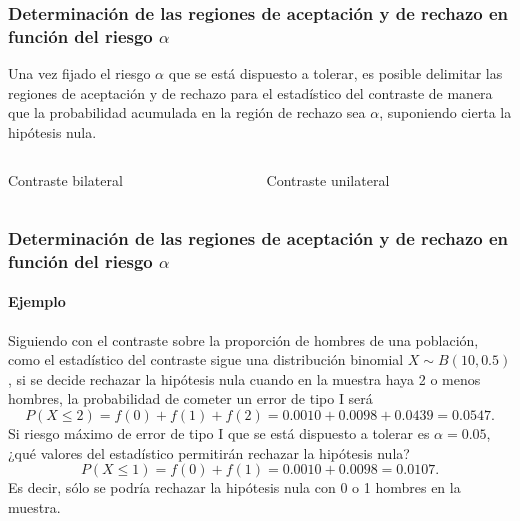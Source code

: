 \begin{frame}
\frametitle{Determinación de las regiones de aceptación y de rechazo en función del riesgo $\alpha$}
Una vez fijado el riesgo $\alpha$ que se está dispuesto a tolerar, es posible delimitar las regiones de aceptación y de rechazo para el estadístico del contraste de manera que la probabilidad acumulada en la región de rechazo sea $\alpha$, suponiendo cierta la hipótesis nula.
\begin{columns}
\begin{column}{0.5\textwidth}
\begin{center}
Contraste bilateral
\resizebox{\textwidth}{!}{}
\end{center}
\end{column}
\begin{column}{0.5\textwidth}
\begin{center}
Contraste unilateral
\resizebox{\textwidth}{!}{}
\end{center}
\end{column}
\end{columns}
\end{frame}


\begin{frame}
\frametitle{Determinación de las regiones de aceptación y de rechazo en función del riesgo $\alpha$}
\framesubtitle{Ejemplo}
Siguiendo con el contraste sobre la proporción de hombres de una población, como el estadístico del contraste sigue una distribución binomial $X\sim B(10,0.5)$, si se decide rechazar la hipótesis nula cuando en la muestra haya 2 o menos hombres, la probabilidad de cometer un error de tipo I será
\[
P(X\leq 2)= f(0)+f(1)+f(2)= 0.0010 + 0.0098 + 0.0439 = 0.0547.
\]
Si riesgo máximo de error de tipo I que se está dispuesto a tolerar es $\alpha=0.05$, ¿qué valores del estadístico permitirán rechazar la hipótesis nula?
\[
P(X\leq 1)= f(0)+f(1) = 0.0010 + 0.0098 = 0.0107.
\]
Es decir, sólo se podría rechazar la hipótesis nula con 0 o 1 hombres en la muestra.

\begin{center}
\end{center}
 \end{frame}


